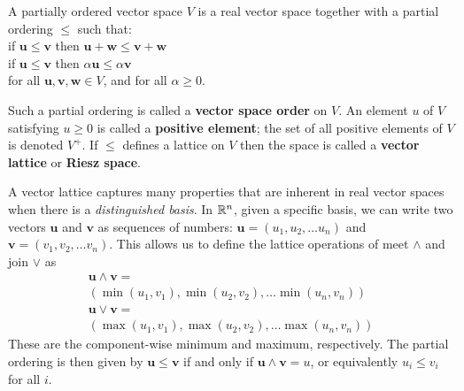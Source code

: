 \begin{definition}
  A partially ordered vector space $V$ is a real vector space together
  with a partial ordering $\le$ such that:\\[5pt]
  \indent if $\mathbf{u}\le\mathbf{v}$ then $\mathbf{u} + \mathbf{w} \le\mathbf{v} + \mathbf{w}$\\[5pt]
  \indent if $\mathbf{u} \le\mathbf{v}$ then $\alpha \mathbf{u} \le \alpha \mathbf{v}$
  \vspace{0.1cm}\\[5pt]
  for all $\mathbf{u},\mathbf{v},\mathbf{w} \in V$, and for all $\alpha \ge 0$. 
  
  Such a partial
  ordering is called a \textbf{vector space order} on $V$. An element
  $u$ of $V$ satisfying $u \ge 0$ is called a \textbf{positive
    element}; the set of all positive elements of $V$ is denoted
  $V^+$. If $\le$ defines a lattice on $V$ then the space is called a
  \textbf{vector lattice} or \textbf{Riesz space}.
\end{definition}

\begin{example}
  \label{example:finite}
  A vector lattice captures many properties that are inherent in real
  vector spaces when there is a \emph{distinguished basis}. In $\mathbb{R}^n$,
  given a specific basis, we can write two vectors $\mathbf{u}$ and $\mathbf{v}$ as
  sequences of numbers: $\mathbf{u} = (u_1,u_2,\ldots u_n)$ and $\mathbf{v} =
  (v_1,v_2,\ldots v_n)$. This allows us to define the lattice
  operations of meet $\land$ and join $\lor$ as
\[\begin{array}{l}
\mathbf{u}\land \mathbf{v} =\\
(\min(u_1,v_1),\min(u_2,v_2),\ldots \min(u_n,v_n))\\[5pt]
\mathbf{u}\lor \mathbf{v} = \\
(\max(u_1,v_1),\max(u_2,v_2),\ldots \max(u_n,v_n))
\end{array}\]
These are the component-wise minimum and maximum, respectively. The partial
ordering is then given by $\mathbf{u} \le\mathbf{v}$ if and only if $\mathbf{u} \land \mathbf{v} = u$, or
equivalently $u_i \le v_i$ for all $i$.
\end{example}
